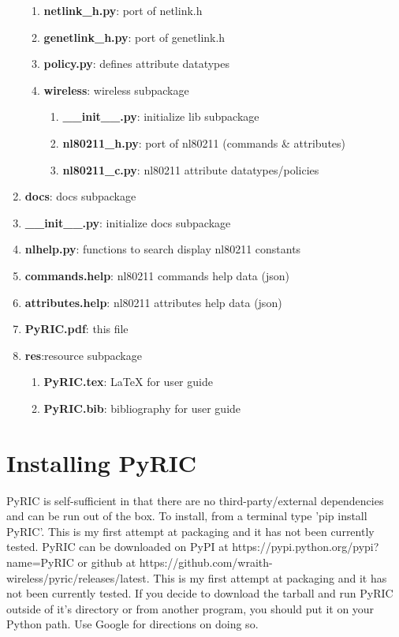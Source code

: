 \documentclass[11pt]{article}
\begin{document}
\begin{enumerate}
\begin{enumerate}
\item \textbf{netlink\_h.py}: port of netlink.h
\item \textbf{genetlink\_h.py}: port of genetlink.h
\item \textbf{policy.py}: defines attribute datatypes
\item \textbf{wireless}: wireless subpackage
\begin{enumerate}
\item \textbf{\_\_init\_\_.py}: initialize lib subpackage
\item \textbf{nl80211\_h.py}: port of nl80211 (commands \& attributes)
\item \textbf{nl80211\_c.py}: nl80211 attribute datatypes/policies
\end{enumerate}
\end{enumerate}
\item \textbf{docs}: docs subpackage
\item \textbf{\_\_init\_\_.py}: initialize docs subpackage
\item \textbf{nlhelp.py}: functions to search display nl80211 constants
\item \textbf{commands.help}: nl80211 commands help data (json)
\item \textbf{attributes.help}: nl80211 attributes help data (json)
\item \textbf{PyRIC.pdf}: this file
\item \textbf{res}:resource subpackage
\begin{enumerate}
\item \textbf{PyRIC.tex}: LaTeX for user guide
\item \textbf{PyRIC.bib}: bibliography for user guide
\end{enumerate}
\end{enumerate}

\section{Installing PyRIC}\label{sec:installing}
PyRIC is self-sufficient in that there are no third-party/external dependencies 
and can be run out of the box. To install, from a terminal type 'pip install 
PyRIC'. This is my first attempt at packaging and it has not been currently 
tested. PyRIC can be downloaded on PyPI at https://pypi.python.org/pypi?name=PyRIC or 
github at https://github.com/wraith-wireless/pyric/releases/latest. This is my first
attempt at packaging and it has not been currently tested. If you decide to download the tarball and run PyRIC outside of it's directory or from another program, you 
should put it on your Python path. Use Google for directions on doing so. 
\end{document}
